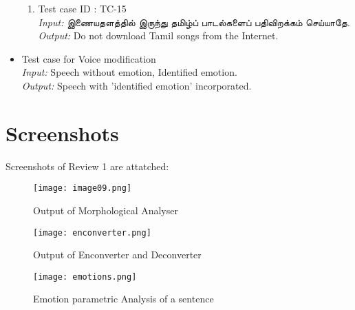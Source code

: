 \documentclass{article}
\begin{document}
\begin{itemize}
\begin{enumerate}
\item Test case ID : TC-15\\
      \textit{Input:} \texttamil{இணையதளத்தில் இருந்து தமிழ்ப் பாடல்களைப் பதிவிறக்கம் செய்யாதே.}\\
      \textit{Output:} Do not download Tamil songs from the Internet. \\
\end{enumerate}
\item Test case for Voice modification\\
\textit{Input:} Speech without emotion, Identified emotion.\\
      \textit{Output:} Speech with 'identified emotion' incorporated. \\
\end{itemize}

\section {Screenshots}\large
Screenshots of Review 1 are attatched:
\begin{figure}[!ht]
\texttt{[image: image09.png]}
\caption{Output of Morphological Analyser}
\label{fig:1}
\end{figure}

\begin{figure}[!ht]
\texttt{[image: enconverter.png]}
\caption{Output of Enconverter and Deconverter}
\label{fig:2}
\end{figure}

\begin{figure}[!ht]
\texttt{[image: emotions.png]}
\caption{Emotion parametric Analysis of a sentence}
\label{fig:3}
\end{figure}

\newpage
\end{document}
